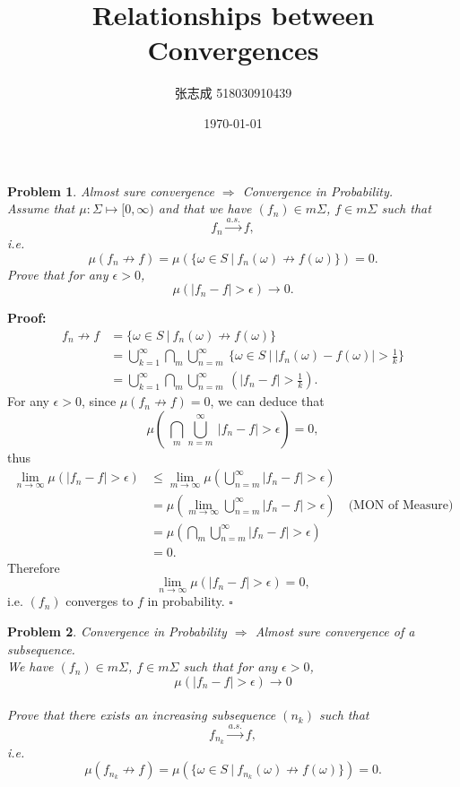 \documentclass[UTF8, 12pt]{article}
\title{Relationships between Convergences}
\author{张志成 518030910439}
\date{\today}
\newenvironment{proof}{\noindent\ignorespaces\textbf{Proof:}}{\hfill $\square$\par\noindent}
\newtheorem{problem}{Problem}
\begin{document}
    \maketitle

    \begin{problem}
        Almost sure convergence $\Longrightarrow$ Convergence in Probability. \\
        Assume that $\mu: \Sigma \mapsto [0, \infty)$ and that we have $(f_n) \in m\Sigma$, $f \in m\Sigma$ such that $$ f_{n} \overset{a.s.}{\longrightarrow} f ,$$ 
        i.e. $$ \mu(f_{n} \not\rightarrow f) = \mu(\{\omega\in S \ |\ f_{n}(\omega) \not\rightarrow f(\omega)\}) = 0.$$ 
        Prove that for any $\epsilon > 0$, $$ \mu(|f_n-f| > \epsilon) \to 0 .$$
    \end{problem}

    \begin{proof}
        \begin{align*}
            f_{n} \not\rightarrow f &= \{\omega\in S \ |\ f_{n}(\omega) \not\rightarrow f(\omega)\} \\
            &= \bigcup_{k=1}^{\infty}\bigcap_{m}\bigcup_{n = m}^{\infty}\ \{\omega \in S \ |\ |f_n(\omega) - f(\omega)| > \frac{1}{k} \} \\
            &= \bigcup_{k=1}^{\infty}\bigcap_{m}\bigcup_{n = m}^{\infty}\ (|f_n- f| > \frac{1}{k}).
        \end{align*}
        For any $\epsilon > 0$,
        since $\mu(f_{n} \not\rightarrow f) = 0$,
        we can deduce that $$ \mu(\ \bigcap_{m}\bigcup_{n = m}^{\infty}\ |f_n- f| > \epsilon) = 0 ,$$ thus
        \begin{align*}
            \lim_{n\to\infty}\mu(|f_n-f| > \epsilon) &\leq \lim_{m\to\infty}\mu(\bigcup_{n = m}^{\infty}  |f_n-f| > \epsilon) \\
            &= \mu(\lim_{m\to\infty}\bigcup_{n = m}^{\infty}  |f_n-f| > \epsilon)\quad \text{(MON of Measure)}\\
            &= \mu(\bigcap_{m}\bigcup_{n = m}^{\infty}  |f_n-f| > \epsilon) \\
            &= 0.
        \end{align*}
        Therefore $$ \lim_{n\to\infty}\mu(|f_n-f| > \epsilon) = 0 ,$$ i.e. $(f_n)$ converges to $f$ in probability.
    \end{proof}

    \begin{problem}
        Convergence in Probability $\Longrightarrow$ Almost sure convergence of a subsequence. \\
        We have $(f_n) \in m\Sigma$, $f \in m\Sigma$ such that for any $\epsilon > 0$, $$ \mu(|f_n-f| > \epsilon) \to 0 $$ \\
        Prove that there exists an increasing subsequence $(n_k)$ such that $$ f_{n_k} \overset{a.s.}{\longrightarrow} f ,$$ 
        i.e. $$ \mu(f_{n_k} \not\rightarrow f) = \mu(\{\omega\in S \ |\ f_{n_k}(\omega) \not\rightarrow f(\omega)\}) = 0. $$ 
    \end{problem}
\end{document}
